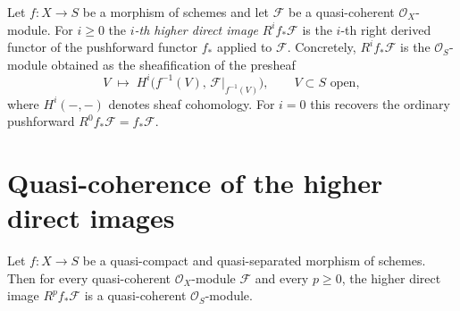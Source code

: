 \begin{definition}\leanok
  \label{def:higher_direct_image}
  Let \(f : X \to S\) be a morphism of schemes and let \(\mathcal{F}\) be a
  quasi-coherent \(\mathcal{O}_X\)-module. For \(i \geq 0\) the \emph{\(i\)-th
  higher direct image} \(R^i f_*\mathcal{F}\) is the \(i\)-th right derived functor
  of the pushforward functor \(f_*\) applied to \(\mathcal{F}\). Concretely,
  \(R^i f_*\mathcal{F}\) is the \(\mathcal{O}_S\)-module obtained as the
  sheafification of the presheaf
  \[
    V \;\longmapsto\; H^i\bigl(f^{-1}(V),\, \mathcal{F}|_{f^{-1}(V)}\bigr),
    \qquad V \subset S \text{ open},
  \]
  where \(H^i(-, -)\) denotes sheaf cohomology. For \(i = 0\) this recovers the
  ordinary pushforward \(R^0 f_*\mathcal{F} = f_*\mathcal{F}\).
\end{definition}

\section{Quasi-coherence of the higher direct images}

\begin{lemma}
  \label{lem:higher_direct_image_quasi_coherent}
  Let \(f : X \to S\) be a quasi-compact and quasi-separated morphism of schemes.
  Then for every quasi-coherent \(\mathcal{O}_X\)-module \(\mathcal{F}\) and every
  \(p \geq 0\), the higher direct image \(R^p f_*\mathcal{F}\) is a quasi-coherent
  \(\mathcal{O}_S\)-module.
\end{lemma}

